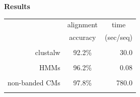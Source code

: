 \documentclass[landscape]{slides}
\begin{document}
%
\begin{slide}
\begin{center}
\large
\textbf{Results}
\end{center}
\medskip
\medskip
\begin{center}

\begin{tabular}{rcr} 
& \multicolumn{1}{c}{alignment} & \multicolumn{1}{c}{time} \\
& \multicolumn{1}{c}{accuracy} & \multicolumn{1}{c}{(sec/seq)} \\ \hline
& \multicolumn{1}{c}{} & \multicolumn{1}{c}{} \\
clustalw & 92.2\% & 30.0 \\ 
& \multicolumn{1}{c}{} & \multicolumn{1}{c}{} \\
HMMs & 96.2\% & 0.08 \\ 
& \multicolumn{1}{c}{} & \multicolumn{1}{c}{} \\
non-banded CMs & 97.8\% & 780.0 \\ 
& \multicolumn{1}{c}{} & \multicolumn{1}{c}{} \\
\end{tabular}
\end{center}

\vfill
\end{slide}
\end{document}
